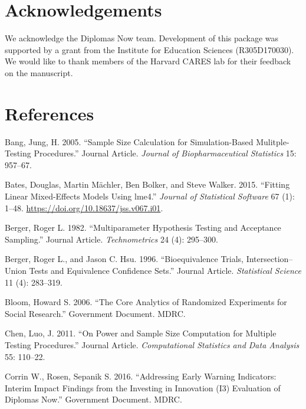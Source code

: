 \documentclass[
]{article}
\newlength{\cslhangindent}
\newlength{\cslentryspacingunit} %
\newenvironment{CSLReferences}[2] %
 {%
  \setlength{\parindent}{0pt}
  \ifodd #1
  \let\oldpar\par
  \def\par{\hangindent=\cslhangindent\oldpar}
  \fi
  \setlength{\parskip}{#2\cslentryspacingunit}
 }%
 {}
\begin{document}
\section*{Acknowledgements}

We acknowledge the Diplomas Now team. Development of this package was
supported by a grant from the Institute for Education Sciences
(R305D170030). We would like to thank members of the Harvard CARES lab
for their feedback on the manuscript.

\section{References}

\hypertarget{refs}{}
\begin{CSLReferences}{1}{0}
\leavevmode{}%
Bang, Jung, H. 2005. {``Sample Size Calculation for Simulation-Based
Mulitple-Testing Procedures.''} Journal Article. \emph{Journal of
Biopharmaceutical Statistics} 15: 957--67.

\leavevmode{}%
Bates, Douglas, Martin Mächler, Ben Bolker, and Steve Walker. 2015.
{``Fitting Linear Mixed-Effects Models Using {lme4}.''} \emph{Journal of
Statistical Software} 67 (1): 1--48.
\url{https://doi.org/10.18637/jss.v067.i01}.

\leavevmode{}%
Berger, Roger L. 1982. {``Multiparameter Hypothesis Testing and
Acceptance Sampling.''} Journal Article. \emph{Technometrics} 24 (4):
295--300.

\leavevmode{}%
Berger, Roger L., and Jason C. Hsu. 1996. {``Bioequivalence Trials,
Intersection--Union Tests and Equivalence Confidence Sets.''} Journal
Article. \emph{Statistical Science} 11 (4): 283--319.

\leavevmode{}%
Bloom, Howard S. 2006. {``The Core Analytics of Randomized Experiments
for Social Research.''} Government Document. MDRC.

\leavevmode{}%
Chen, Luo, J. 2011. {``On Power and Sample Size Computation for Multiple
Testing Procedures.''} Journal Article. \emph{Computational Statistics
and Data Analysis} 55: 110--22.

\leavevmode{}%
Corrin W., Rosen, Sepanik S. 2016. {``Addressing Early Warning
Indicators: Interim Impact Findings from the Investing in Innovation
(I3) Evaluation of Diplomas Now.''} Government Document. MDRC.


\end{CSLReferences}
\end{document}
